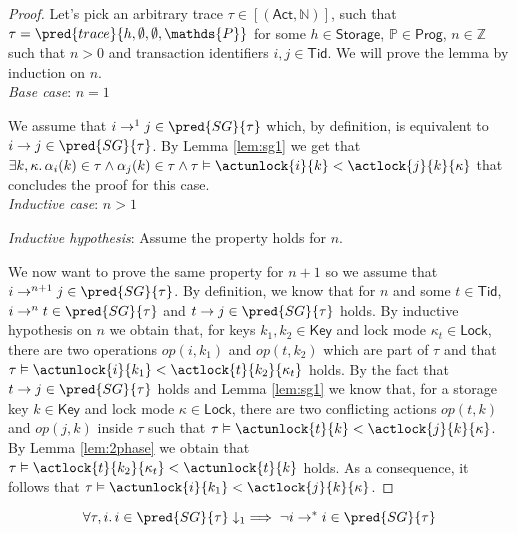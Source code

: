 {\parindent0pt
\begin{proof}
Let's pick an arbitrary trace $\tau \in [(\mathsf{Act}, \mathds{N})]$, such that $\tau = \pred{trace}{h, \emptyset, \emptyset, \mathds{P}}$ for some $h \in \mathsf{Storage}$, $\mathds{P} \in \mathsf{Prog}$, $n \in \mathds{Z}$ such that $n > 0$ and transaction identifiers $i, j \in \mathsf{Tid}$. We will prove the lemma by induction on $n$. \\

\textit{Base case}: $n = 1$

We assume that $i \rightarrow^1 j \in \pred{SG}{\tau}$ which, by definition, is equivalent to $i \rightarrow j \in \pred{SG}{\tau}$. By Lemma \ref{lem:sg1} we get that $\exists k, \kappa \ldotp \alpha_i(k) \in \tau \land \alpha_j(k) \in \tau \land \tau \vDash \actunlock{i}{k} < \actlock{j}{k}{\kappa}$ that concludes the proof for this case. \\

\textit{Inductive case}: $n > 1$

\textit{Inductive hypothesis}: Assume the property holds for $n$.

We now want to prove the same property for $n + 1$ so we assume that $i \rightarrow^{n+1} j \in \pred{SG}{\tau}$. By definition, we know that for $n$ and some $t \in \mathsf{Tid}$, $i \rightarrow^n t \in \pred{SG}{\tau}$ and $t \rightarrow j \in \pred{SG}{\tau}$ holds. By inductive hypothesis on $n$ we obtain that, for keys $k_1, k_2 \in \mathsf{Key}$ and lock mode $\kappa_t \in \mathsf{Lock}$, there are two operations $op(i, k_1)$ and $op(t, k_2)$ which are part of $\tau$ and that $\tau \vDash \actunlock{i}{k_1} < \actlock{t}{k_2}{\kappa_t}$ holds. By the fact that $t \rightarrow j \in \pred{SG}{\tau}$ holds and Lemma \ref{lem:sg1} we know that, for a storage key $k \in \mathsf{Key}$ and lock mode $\kappa \in \mathsf{Lock}$, there are two conflicting actions $op(t, k)$ and $op(j, k)$ inside $\tau$ such that $\tau \vDash \actunlock{t}{k} < \actlock{j}{k}{\kappa}$. By Lemma \ref{lem:2phase} we obtain that $\tau \vDash \actlock{t}{k_2}{\kappa_t} < \actunlock{t}{k}$ holds. As a consequence, it follows that $\tau \vDash \actunlock{i}{k_1} < \actlock{j}{k}{\kappa}$.
\end{proof}
}

\thm \label{thm:sgAcyclic}
\[
\forall \tau, i \ldotp i \in \pred{SG}{\tau} \downarrow_1 \implies \lnot i \rightarrow^* i \in \pred{SG}{\tau}
\]

